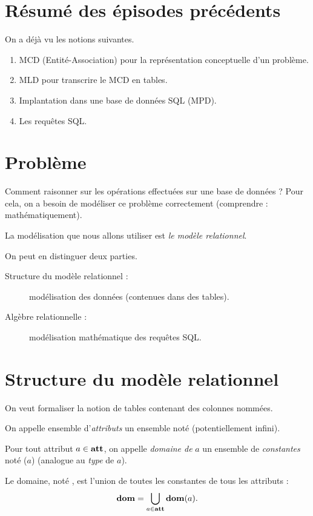 \section{Résumé des épisodes précédents}

On a déjà vu les notions suivantes.
\begin{enumerate}
\item MCD (Entité-Association) pour la représentation conceptuelle d'un problème.
\item MLD pour transcrire le MCD en tables.
\item Implantation dans une base de données SQL (MPD).
\item Les requêtes SQL.
\end{enumerate}


\section{Problème}

Comment raisonner sur les opérations effectuées sur une base de
données ? Pour cela, on a besoin de  modéliser  ce problème correctement
(comprendre : mathématiquement).

La modélisation que nous allons utiliser est \emph{le modèle relationnel}.

On peut en distinguer deux parties.
\begin{description}
\item[Structure du modèle relationnel :] modélisation des données (contenues dans des tables).
\item[Algèbre relationnelle :] modélisation mathématique des requêtes SQL.
\end{description}

\section{Structure du modèle relationnel}

On veut formaliser la notion de tables contenant des colonnes nommées.

\begin{defi}
  On appelle  ensemble d'\emph{attributs} un ensemble noté \att{} (potentiellement infini).

  Pour tout attribut $a\in\mathbf{att}$, on appelle \emph{domaine de }$a$ un ensemble de
  \emph{constantes} noté \dom($a$) (analogue au \emph{type} de $a$).

  Le domaine, noté \dom{}, est l'union de toutes les constantes de tous les attributs : 
  \begin{equation*}
    \mathbf{dom} = \bigcup_{a \in \mathbf{att}} \mathbf{dom}(a).
  \end{equation*}
\end{defi}

